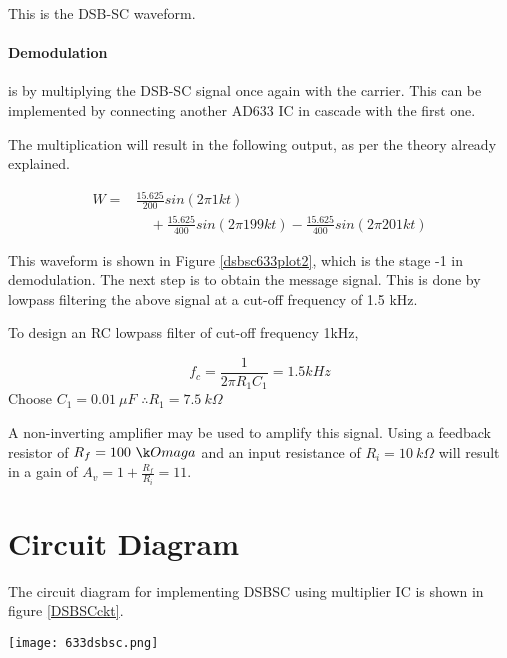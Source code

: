  This is the DSB-SC waveform.
 
 \paragraph{Demodulation}  is by multiplying the DSB-SC signal once again with the carrier. This can be implemented by connecting another AD633 IC in cascade with the first one.

\noindent The multiplication will result in the following output, as per the theory already explained.

\begin{equation}
\begin{split}
W=& \frac{15.625}{200}sin(2\pi 1kt)\\
&\quad  +\frac{15.625}{400}sin(2\pi199kt) -\frac{15.625}{400}sin(2\pi 201kt)
\end{split}
\end{equation}

\noindent This waveform is shown in Figure \ref{dsbsc633plot2}, which is the stage -1 in demodulation. The next step is to obtain the message signal. This is done by lowpass filtering the above signal at a cut-off frequency of 1.5 kHz.

To design an RC lowpass filter of cut-off frequency 1kHz,

\begin{equation}
f_c=\frac{1}{2\pi R_1C_1}=1.5kHz
\end{equation}
Choose $C_1=0.01\  \mu F$
$\therefore  R_1 =7.5 \ k \Omega$

A non-inverting amplifier may be used to amplify this signal. Using a feedback resistor of $R_f= 100 \ \k Omaga$ and an input resistance of $R_i=10\ k\Omega$ will result in a gain of $A_v=1+\frac{R_f}{R_i}=11$.

\section*{Circuit Diagram}
The circuit diagram for implementing DSBSC using multiplier IC is shown in figure \ref{DSBSCckt}.
\begin{sidewaysfigure}[ht]
    \texttt{[image: 633dsbsc.png]}
    \caption{Circuit for DSB-SC generation and detection using AD633 multiplier IC}
    \label{DSBSCckt}
\end{sidewaysfigure}

